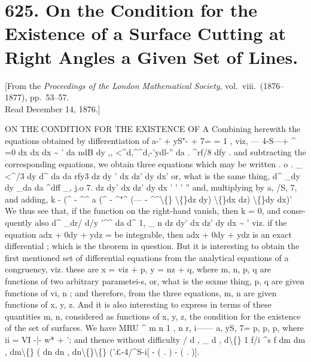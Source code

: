 \documentclass[12pt,a4paper]{article}
\begin{document}
\newpage
\section*{625. On the Condition for the Existence of a Surface Cutting at Right Angles a Given Set of Lines.}

\begin{center}
\small[From the \textit{Proceedings of the London Mathematical Society}, vol.~viii.\ (1876--1877), pp.~53--57.\\Read December 14, 1876.]
\end{center}

ON THE CONDITION FOR THE EXISTENCE OF A
Combining herewith the equations obtained by differentiation of
a-' + yS"- + 7= =
1 ,
viz,
--- 4-S---+ \textasciicircum{} =0
dx
dx
dx \textasciitilde{}
'
da
ndB
dy
,,
<\textasciicircum{}d,\textasciicircum{}\textasciicircum{}d,-'ydl-''
da
.
\textasciicircum{}rf/8
dfy
.
and
subtracting
the
corresponding
equations,
we
obtain
three
equations which may be
written
.
o
.
\_ <\textasciicircum{}/3
dy
d\textasciicircum{}
da
da
rfy3
dz
dy
' dx
dz' dy
dx'
or, what
is the same thing,
d\textasciicircum{} \_dy
dy \_da
da \textasciicircum{}dff \_,
j.o
7.
dz
dy'
dx
dz'
dy
dx
'
'
'
''
and, multiplying by
a,
/S,
7, and adding,
k - (\textasciicircum{} - \textasciicircum{}\textasciicircum{}
a (\textasciicircum{} - \textasciicircum{}"\textasciicircum{}
(--- - \textasciicircum{}\textasciicircum{}\textbackslash\{\}
\textbackslash\{\}dz
dy)
\textbackslash\{\}dx
dz)
\textbackslash\{\}dy
dx)'
We
thus
see
that,
if
the
function
on
the
right-hand
vanish,
then
k = 0,
and
conse-
quently also
d\textasciicircum{} \_dr/
d/y
'\textasciicircum{}\textasciicircum{}
da
d\textasciicircum{}
1, \_ n
dz
dy'
dx
dz'
dy
dx
\textasciitilde{}
'
viz.
if
the
equation
adx + 0dy + ydz =
be
integrable,
then
adx + 0dy + ydz
is
an
exact
differential
;
which
is the theorem
in
question.
But
it
is
interesting
to
obtain
the
first
mentioned
set
of
differential
equations
from
the
analytical
equations
of
a
congruency,
viz.
these
are x = viz + p,
y = nz + q,
where
m,
n,
p,
q
are
functions
of
two
arbitrary
parametei-s,
or,
what
is
the
ssxme
thing,
p,
q
are
given
functions
of
vi,
n
;
and
therefore,
from
the
three
equations,
m, n
are
given
functions
of
x,
y,
z.
And
it
is
also
interesting
to
express
in
terms
of
these
quantities
m,
n,
considered
as
functions
of
x,
y,
z,
the
condition
for
the
existence of the
set
of surfaces.
We have
MRU
\textasciicircum{}
m
n
1
,
n
r,
i------
a,
yS, 7= p,
p,
p, where
ii = VI
-|- w* + \guillemotleft{}';
and thence without
difficulty
/
d
,
\_ d
,
d\textbackslash\{\}
1
f/i
\textasciicircum{}s f
dm
dm
, dm\textbackslash\{\}
(
dn
dn
, dn\textbackslash\{\}\textbackslash\{\}
('\pounds{}-4/\textasciicircum{}S-i[
-
(
.
)
-
(
.
)].
\end{document}
